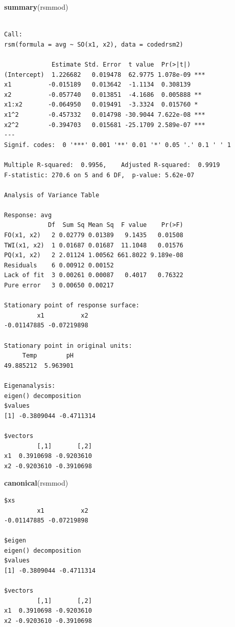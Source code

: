 \documentclass[
  12pt,
]{article}
\newenvironment{Shaded}{\begin{snugshade}}{\end{snugshade}}
\newcommand{\FunctionTok}[1]{\textcolor[rgb]{0.13,0.29,0.53}{\textbf{#1}}}
\newcommand{\NormalTok}[1]{#1}
\begin{document}
\begin{Shaded}
\begin{Highlighting}[]
\FunctionTok{summary}\NormalTok{(rsmmod)}
\end{Highlighting}
\end{Shaded}

\begin{verbatim}

Call:
rsm(formula = avg ~ SO(x1, x2), data = codedrsm2)

             Estimate Std. Error  t value  Pr(>|t|)    
(Intercept)  1.226682   0.019478  62.9775 1.078e-09 ***
x1          -0.015189   0.013642  -1.1134  0.308139    
x2          -0.057740   0.013851  -4.1686  0.005888 ** 
x1:x2       -0.064950   0.019491  -3.3324  0.015760 *  
x1^2        -0.457332   0.014798 -30.9044 7.622e-08 ***
x2^2        -0.394703   0.015681 -25.1709 2.589e-07 ***
---
Signif. codes:  0 '***' 0.001 '**' 0.01 '*' 0.05 '.' 0.1 ' ' 1

Multiple R-squared:  0.9956,    Adjusted R-squared:  0.9919 
F-statistic: 270.6 on 5 and 6 DF,  p-value: 5.62e-07

Analysis of Variance Table

Response: avg
            Df  Sum Sq Mean Sq  F value    Pr(>F)
FO(x1, x2)   2 0.02779 0.01389   9.1435   0.01508
TWI(x1, x2)  1 0.01687 0.01687  11.1048   0.01576
PQ(x1, x2)   2 2.01124 1.00562 661.8022 9.189e-08
Residuals    6 0.00912 0.00152                   
Lack of fit  3 0.00261 0.00087   0.4017   0.76322
Pure error   3 0.00650 0.00217                   

Stationary point of response surface:
         x1          x2 
-0.01147885 -0.07219898 

Stationary point in original units:
     Temp        pH 
49.885212  5.963901 

Eigenanalysis:
eigen() decomposition
$values
[1] -0.3809044 -0.4711314

$vectors
         [,1]       [,2]
x1  0.3910698 -0.9203610
x2 -0.9203610 -0.3910698
\end{verbatim}

\begin{Shaded}
\begin{Highlighting}[]
\FunctionTok{canonical}\NormalTok{(rsmmod)}
\end{Highlighting}
\end{Shaded}

\begin{verbatim}
$xs
         x1          x2 
-0.01147885 -0.07219898 

$eigen
eigen() decomposition
$values
[1] -0.3809044 -0.4711314

$vectors
         [,1]       [,2]
x1  0.3910698 -0.9203610
x2 -0.9203610 -0.3910698
\end{verbatim}
\end{document}
